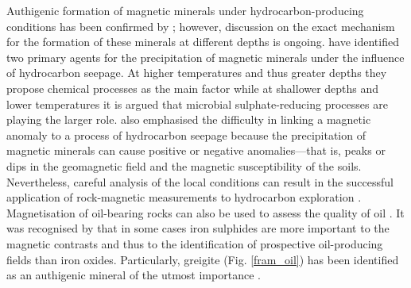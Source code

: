 Authigenic formation of magnetic minerals under hydrocarbon-producing conditions has been confirmed by \citet{Abubakar2015}; however, discussion on the exact mechanism for the formation of these minerals at different depths is ongoing. \citet{Machel1991} have identified two primary agents for the precipitation of magnetic minerals under the influence of hydrocarbon seepage. At higher temperatures and thus greater depths they propose chemical processes as the main factor while at shallower depths and lower temperatures it is argued that microbial sulphate-reducing processes are playing the larger role. \citet{Machel1991} also emphasised the difficulty in linking a magnetic anomaly to a process of hydrocarbon seepage because the precipitation of magnetic minerals can cause positive or negative anomalies---that is, peaks or dips in the geomagnetic field and the magnetic susceptibility of the soils. Nevertheless, careful analysis of the local conditions can result in the successful application of rock-magnetic measurements to hydrocarbon exploration \citep{Donovan1984,Liu2006,Emmerton2013B}. Magnetisation of oil-bearing rocks can also be used to assess the quality of oil \citep{Emmerton2013}. It was recognised by \citet{Reynolds1993} that in some cases iron sulphides are more important to the magnetic contrasts and thus to the identification of prospective oil-producing fields than iron oxides. Particularly, greigite (Fig. \ref{fram_oil}) has been identified as an authigenic mineral of the utmost importance \citep{Reynolds1993}.
